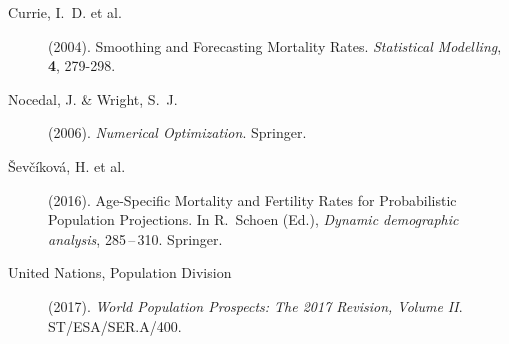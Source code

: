 \documentclass[twoside]{report}
\begin{document}
\begin{description}
\item[Currie, I.~D. et al.]
	(2004). Smoothing and Forecasting Mortality Rates. {\it Statistical
	Modelling}, {\bf 4}, 279-298.
\item[Nocedal, J. \& Wright, S.~J.] (2006). {\it Numerical Optimization}. Springer.
\item[\v{S}ev\v{c}\'ikov\'a, H. et al.] (2016). 
Age-Specific Mortality and Fertility Rates for Probabilistic Population Projections. In R.~Schoen
(Ed.), {\it Dynamic demographic analysis}, 285\,--\,310. Springer.
\item[United Nations, Population Division] (2017). 
{\it World Population Prospects: The 2017 Revision, Volume II}. ST/ESA/SER.A/400.
\end{description}

\end{document}
